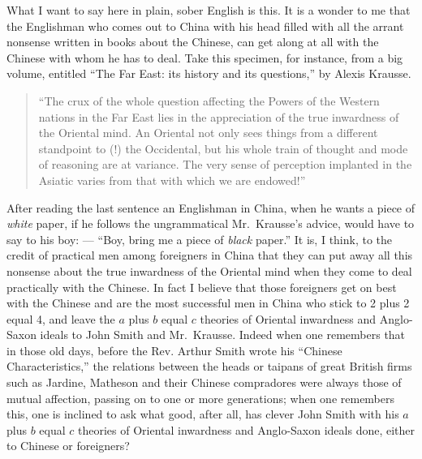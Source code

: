 What I want to say here in plain, sober English is this.
It is a wonder to me that the Englishman who comes out to China with his head filled with all the arrant nonsense written in books about the Chinese, can get along at all with the Chinese with whom he has to deal.
Take this specimen, for instance, from a big volume, entitled ``The Far East: its history and its questions,'' by Alexis Krausse. 
\begin{quote}
``The crux of the whole question affecting the Powers of the Western nations in the Far East lies in the appreciation of the true inwardness of the Oriental mind.
An Oriental not only sees things from a different standpoint to (!) the Occidental, but his whole train of thought and mode of reasoning are at variance.
The very sense of perception implanted in the Asiatic varies from that with which we are endowed!''
\end{quote}

After reading the last sentence an Englishman in China, when he wants a piece of \emph{white} paper, if he follows the ungrammatical Mr.~Krausse's advice, would have to say to his boy: --- ``Boy, bring me a piece of \emph{black} paper.''
It is, I think, to the credit of practical men among foreigners in China that they can put away all this nonsense about the true inwardness of the Oriental mind when they come to deal practically with the Chinese.
In fact I believe that those foreigners get on best with the Chinese and are the most successful men in China who stick to 2 plus 2 equal 4, and leave the $a$ plus $b$ equal $c$ theories of Oriental inwardness and Anglo-Saxon ideals to John Smith and Mr.~Krausse.
Indeed when one remembers that in those old days, before the Rev. Arthur Smith wrote his ``Chinese Characteristics,'' the relations between the heads or taipans  of great British firms such as Jardine, Matheson and their Chinese compradores  were always those of mutual affection, passing on to one or more generations;
when one remembers this, one is inclined to ask what good, after all, has clever John Smith with his $a$ plus $b$ equal $c$ theories of Oriental inwardness and Anglo-Saxon ideals done, either to Chinese or foreigners?

